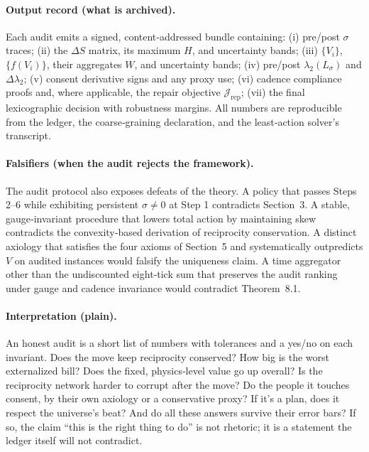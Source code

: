 \documentclass[11pt]{article}
\begin{document}
\paragraph{Output record (what is archived).}
Each audit emits a signed, content‑addressed bundle containing: (i) pre/post $\sigma$ traces; (ii) the $\Delta S$ matrix, its maximum $H$, and uncertainty bands; (iii) $\{V_i\}$, $\{f(V_i)\}$, their aggregates $W$, and uncertainty bands; (iv) pre/post $\lambda_2(L_\sigma)$ and $\Delta\lambda_2$; (v) consent derivative signs and any proxy use; (vi) cadence compliance proofs and, where applicable, the repair objective $\mathcal{J}_{\mathrm{rep}}$; (vii) the final lexicographic decision with robustness margins. All numbers are reproducible from the ledger, the coarse‑graining declaration, and the least‑action solver’s transcript.

\paragraph{Falsifiers (when the audit rejects the framework).}
The audit protocol also exposes defeats of the theory. A policy that passes Steps 2–6 while exhibiting persistent $\sigma\neq 0$ at Step 1 contradicts Section~3. A stable, gauge‑invariant procedure that lowers total action by maintaining skew contradicts the convexity‑based derivation of reciprocity conservation. A distinct axiology that satisfies the four axioms of Section~5 and systematically outpredicts $V$ on audited instances would falsify the uniqueness claim. A time aggregator other than the undiscounted eight‑tick sum that preserves the audit ranking under gauge and cadence invariance would contradict Theorem~8.1.

\paragraph{Interpretation (plain).}
An honest audit is a short list of numbers with tolerances and a yes/no on each invariant. Does the move keep reciprocity conserved? How big is the worst externalized bill? Does the fixed, physics‑level value go up overall? Is the reciprocity network harder to corrupt after the move? Do the people it touches consent, by their own axiology or a conservative proxy? If it’s a plan, does it respect the universe’s beat? And do all these answers survive their error bars? If so, the claim “this is the right thing to do” is not rhetoric; it is a statement the ledger itself will not contradict.
\end{document}
